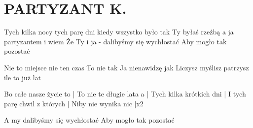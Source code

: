 \documentclass[../../../songbook.tex]{subfiles}
\begin{document}
\TabPositions{8cm} %
\section*{PARTYZANT K.}
{}
\vspace{0.5cm}
\-\hspace{1cm} Tych kilka nocy tych parę dni		   \newline
\-\hspace{1cm} kiedy wszystko było tak			   \newline
\-\hspace{1cm} Ty byłaś rzeźbą a ja partyzantem		  \newline
\-\hspace{1cm} i wiem						 \newline
\-\hspace{1cm} Że Ty i ja - dalibyśmy się wychłostać	  \newline
\-\hspace{1cm} Aby mogło tak pozostać			 \newline

Nie to miejsce nie ten czas			  \newline
To nie tak							 \newline
Ja nienawidzę jak					 \newline
Liczysz myślisz patrzysz ile to już lat	 \newline

\-\hspace{1cm} Bo całe nasze życie to		\tab	|\newline
\-\hspace{1cm} To nie te długie lata a		\tab	|\newline
\-\hspace{1cm} Tych kilka krótkich dni		\tab    |\newline
\-\hspace{1cm} I tych parę chwil z których	\tab	|\newline
\-\hspace{1cm} Niby nie wynika nic			\tab   |x2\newline

A my dalibyśmy się wychłostać	 \newline
Aby mogło tak pozostać			 \newline
\end{document}
